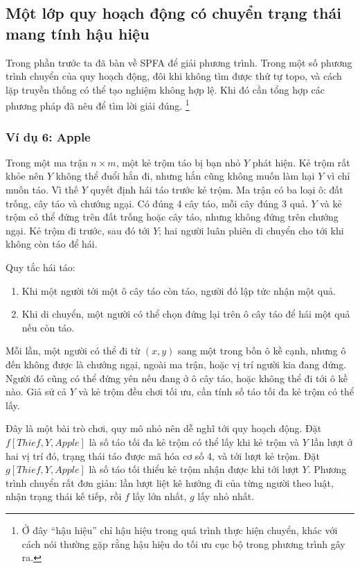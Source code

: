 \documentclass[11pt]{article}
\begin{document}
\subsection{Một lớp quy hoạch động có chuyển trạng thái mang tính hậu hiệu}

Trong phần trước ta đã bàn về SPFA để giải phương trình. Trong một số phương
trình chuyển của quy hoạch động, đôi khi không tìm được thứ tự topo, và cách
lặp truyền thống có thể tạo nghiệm không hợp lệ. Khi đó cần tổng hợp các
phương pháp đã nêu để tìm lời giải đúng.
\footnote{Ở đây ``hậu hiệu'' chỉ hậu hiệu trong quá trình thực hiện chuyển,
khác với cách nói thường gặp rằng hậu hiệu do tối ưu cục bộ trong phương trình
gây ra.}

\subsubsection*{Ví dụ 6: Apple}

Trong một ma trận \(n\times m\), một kẻ trộm táo bị bạn nhỏ \(Y\) phát hiện.
Kẻ trộm rất khỏe nên \(Y\) không thể đuổi hắn đi, nhưng hắn cũng không muốn
làm hại \(Y\) vì chỉ muốn táo. Vì thế \(Y\) quyết định hái táo trước kẻ trộm.
Ma trận có ba loại ô: đất trống, cây táo và chướng ngại. Có đúng 4 cây táo,
mỗi cây đúng 3 quả. \(Y\) và kẻ trộm có thể đứng trên đất trống hoặc cây táo,
nhưng không đứng trên chướng ngại. Kẻ trộm đi trước, sau đó tới \(Y\); hai
người luân phiên di chuyển cho tới khi không còn táo để hái.

Quy tắc hái táo:
\begin{enumerate}
  \item Khi một người tới một ô cây táo còn táo, người đó lập tức nhận một
  quả.
  \item Khi di chuyển, một người có thể chọn đứng lại trên ô cây táo để hái
  một quả nếu còn táo.
\end{enumerate}
Mỗi lần, một người có thể đi từ \((x,y)\) sang một trong bốn ô kề cạnh, nhưng
ô đến không được là chướng ngại, ngoài ma trận, hoặc vị trí người kia đang
đứng. Người đó cũng có thể đứng yên nếu đang ở ô cây táo, hoặc không thể đi
tới ô kề nào. Giả sử cả \(Y\) và kẻ trộm đều chơi tối ưu, cần tính số táo tối
đa kẻ trộm có thể lấy.

Đây là một bài trò chơi, quy mô nhỏ nên dễ nghĩ tới quy hoạch động. Đặt
\(f[\mathit{Thief},Y,\mathit{Apple}]\) là số táo tối đa kẻ trộm có thể lấy khi
kẻ trộm và \(Y\) lần lượt ở hai vị trí đó, trạng thái táo được mã hóa cơ số
4, và tới lượt kẻ trộm. Đặt
\(g[\mathit{Thief},Y,\mathit{Apple}]\) là số táo tối thiểu kẻ trộm nhận được
khi tới lượt \(Y\). Phương trình chuyển rất đơn giản: lần lượt liệt kê hướng
đi của từng người theo luật, nhận trạng thái kế tiếp, rồi \(f\) lấy lớn nhất,
\(g\) lấy nhỏ nhất.
\end{document}
